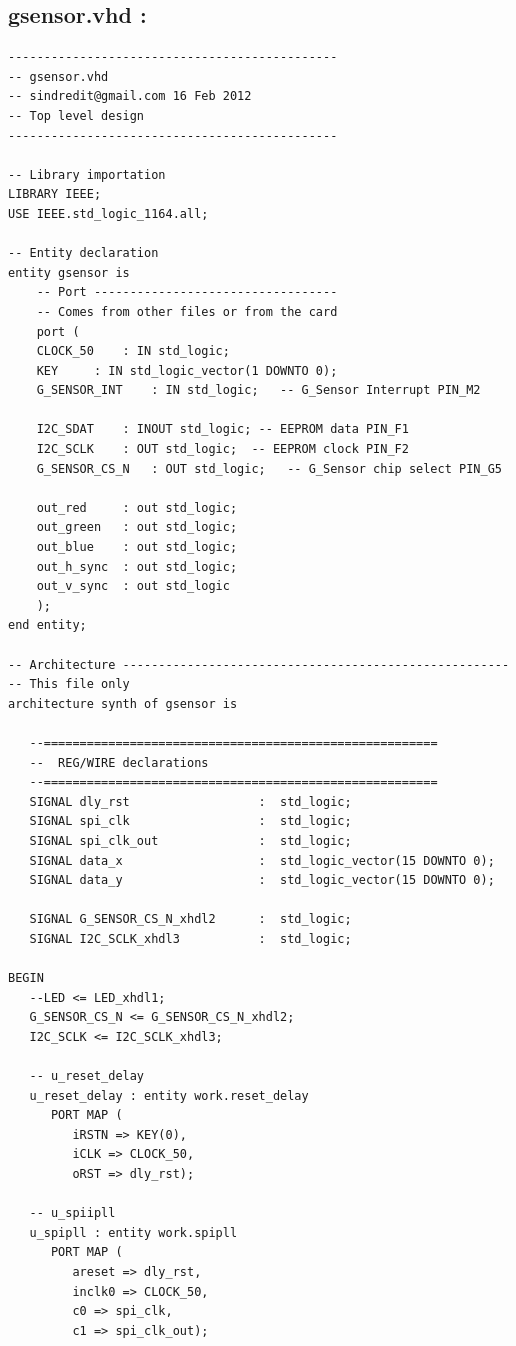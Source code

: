 \documentclass[12pt,a4paper,hyperlinks]{rapport_unif}
\begin{document}
\subsection*{gsensor.vhd :}
\begin{lstlisting}
----------------------------------------------
-- gsensor.vhd
-- sindredit@gmail.com 16 Feb 2012
-- Top level design
----------------------------------------------

-- Library importation
LIBRARY IEEE;
USE IEEE.std_logic_1164.all;

-- Entity declaration
entity gsensor is
    -- Port ----------------------------------
    -- Comes from other files or from the card
    port (
	CLOCK_50	: IN std_logic;
	KEY		: IN std_logic_vector(1 DOWNTO 0);   
	G_SENSOR_INT	: IN std_logic;   -- G_Sensor Interrupt PIN_M2
		
	I2C_SDAT	: INOUT std_logic; -- EEPROM data PIN_F1
	I2C_SCLK	: OUT std_logic;  -- EEPROM clock PIN_F2
	G_SENSOR_CS_N	: OUT std_logic;   -- G_Sensor chip select PIN_G5
      
	out_red		: out std_logic;
	out_green	: out std_logic;
	out_blue	: out std_logic;
	out_h_sync	: out std_logic;
	out_v_sync	: out std_logic
	);
end entity;
    
-- Architecture ------------------------------------------------------	
-- This file only
architecture synth of gsensor is

   --=======================================================
   --  REG/WIRE declarations
   --=======================================================
   SIGNAL dly_rst                  :  std_logic;   
   SIGNAL spi_clk                  :  std_logic;   
   SIGNAL spi_clk_out              :  std_logic;   
   SIGNAL data_x                   :  std_logic_vector(15 DOWNTO 0);
   SIGNAL data_y                   :  std_logic_vector(15 DOWNTO 0);
   
   SIGNAL G_SENSOR_CS_N_xhdl2      :  std_logic;   
   SIGNAL I2C_SCLK_xhdl3           :  std_logic;   

BEGIN
   --LED <= LED_xhdl1;
   G_SENSOR_CS_N <= G_SENSOR_CS_N_xhdl2;
   I2C_SCLK <= I2C_SCLK_xhdl3;
	
   -- u_reset_delay
   u_reset_delay : entity work.reset_delay 
      PORT MAP (
         iRSTN => KEY(0),
         iCLK => CLOCK_50,
         oRST => dly_rst);   
   
   -- u_spiipll
   u_spipll : entity work.spipll 
      PORT MAP (
         areset => dly_rst,
         inclk0 => CLOCK_50,
         c0 => spi_clk,
         c1 => spi_clk_out);   
   

\end{lstlisting}
\end{document}
